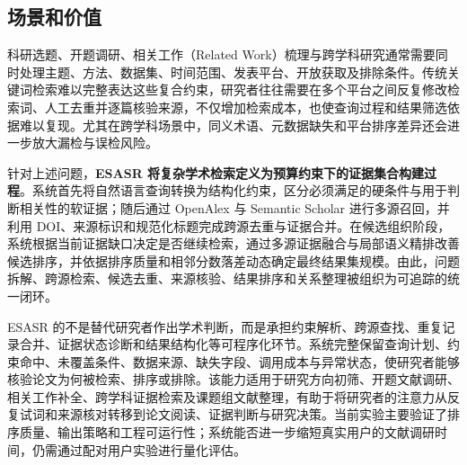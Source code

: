 \documentclass[a4paper,12pt,fontset=none]{ctexart}
\begin{document}
\subsection{场景和价值}

科研选题、开题调研、相关工作（Related Work）梳理与跨学科研究通常需要同时处理主题、方法、数据集、时间范围、发表平台、开放获取及排除条件。传统关键词检索难以完整表达这些复合约束，研究者往往需要在多个平台之间反复修改检索词、人工去重并逐篇核验来源，不仅增加检索成本，也使查询过程和结果筛选依据难以复现。尤其在跨学科场景中，同义术语、元数据缺失和平台排序差异还会进一步放大漏检与误检风险。

针对上述问题，\textbf{ESASR 将复杂学术检索定义为预算约束下的证据集合构建过程}。系统首先将自然语言查询转换为结构化约束，区分必须满足的硬条件与用于判断相关性的软证据；随后通过 OpenAlex 与 Semantic Scholar 进行多源召回，并利用 DOI、来源标识和规范化标题完成跨源去重与证据合并。在候选组织阶段，系统根据当前证据缺口决定是否继续检索，通过多源证据融合与局部语义精排改善候选排序，并依据排序质量和相邻分数落差动态确定最终结果集规模。由此，问题拆解、跨源检索、候选去重、来源核验、结果排序和关系整理被组织为可追踪的统一闭环。

ESASR 的不是替代研究者作出学术判断，而是承担约束解析、跨源查找、重复记录合并、证据状态诊断和结果结构化等可程序化环节。系统完整保留查询计划、约束命中、未覆盖条件、数据来源、缺失字段、调用成本与异常状态，使研究者能够核验论文为何被检索、排序或排除。该能力适用于研究方向初筛、开题文献调研、相关工作补全、跨学科证据检索及课题组文献整理，有助于将研究者的注意力从反复试词和来源核对转移到论文阅读、证据判断与研究决策。当前实验主要验证了排序质量、输出策略和工程可运行性；系统能否进一步缩短真实用户的文献调研时间，仍需通过配对用户实验进行量化评估。
\end{document}
